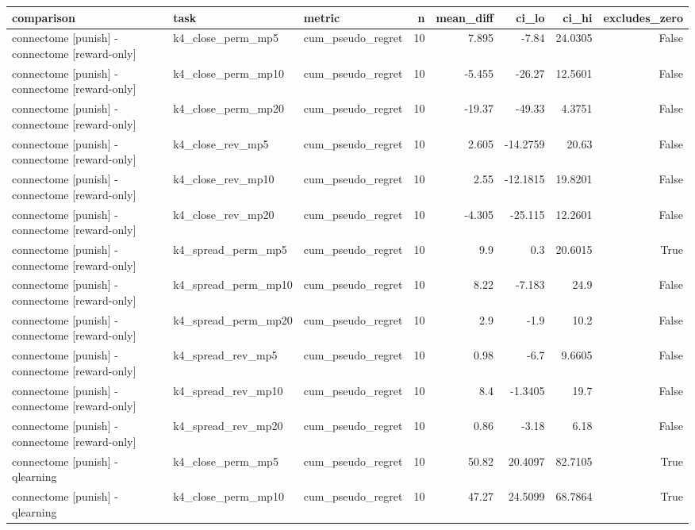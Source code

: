 \begin{table}[t]
\centering
\small
\begin{tabular}{lllrrrrr}
\toprule
comparison & task & metric & n & mean\_diff & ci\_lo & ci\_hi & excludes\_zero \\
\midrule
connectome [punish] - connectome [reward-only] & k4\_close\_perm\_mp5 & cum\_pseudo\_regret & 10 & 7.895 & -7.84 & 24.0305 & False \\
connectome [punish] - connectome [reward-only] & k4\_close\_perm\_mp10 & cum\_pseudo\_regret & 10 & -5.455 & -26.27 & 12.5601 & False \\
connectome [punish] - connectome [reward-only] & k4\_close\_perm\_mp20 & cum\_pseudo\_regret & 10 & -19.37 & -49.33 & 4.3751 & False \\
connectome [punish] - connectome [reward-only] & k4\_close\_rev\_mp5 & cum\_pseudo\_regret & 10 & 2.605 & -14.2759 & 20.63 & False \\
connectome [punish] - connectome [reward-only] & k4\_close\_rev\_mp10 & cum\_pseudo\_regret & 10 & 2.55 & -12.1815 & 19.8201 & False \\
connectome [punish] - connectome [reward-only] & k4\_close\_rev\_mp20 & cum\_pseudo\_regret & 10 & -4.305 & -25.115 & 12.2601 & False \\
connectome [punish] - connectome [reward-only] & k4\_spread\_perm\_mp5 & cum\_pseudo\_regret & 10 & 9.9 & 0.3 & 20.6015 & True \\
connectome [punish] - connectome [reward-only] & k4\_spread\_perm\_mp10 & cum\_pseudo\_regret & 10 & 8.22 & -7.183 & 24.9 & False \\
connectome [punish] - connectome [reward-only] & k4\_spread\_perm\_mp20 & cum\_pseudo\_regret & 10 & 2.9 & -1.9 & 10.2 & False \\
connectome [punish] - connectome [reward-only] & k4\_spread\_rev\_mp5 & cum\_pseudo\_regret & 10 & 0.98 & -6.7 & 9.6605 & False \\
connectome [punish] - connectome [reward-only] & k4\_spread\_rev\_mp10 & cum\_pseudo\_regret & 10 & 8.4 & -1.3405 & 19.7 & False \\
connectome [punish] - connectome [reward-only] & k4\_spread\_rev\_mp20 & cum\_pseudo\_regret & 10 & 0.86 & -3.18 & 6.18 & False \\
connectome [punish] - qlearning & k4\_close\_perm\_mp5 & cum\_pseudo\_regret & 10 & 50.82 & 20.4097 & 82.7105 & True \\
connectome [punish] - qlearning & k4\_close\_perm\_mp10 & cum\_pseudo\_regret & 10 & 47.27 & 24.5099 & 68.7864 & True \\

\end{tabular}
\end{table}
